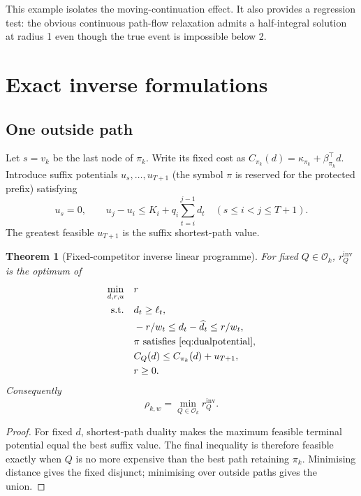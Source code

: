 \documentclass[11pt]{article}
\newtheorem{theorem}{Theorem}[section]
\theoremstyle{definition}
\newcommand{\cO}{\mathcal{O}}
\newcommand{\dhat}{\widehat d}
\newcommand{\ellv}{\ell}
\begin{document}
This example isolates the moving-continuation effect. It also provides a regression test: the obvious continuous path-flow relaxation admits a half-integral solution at radius 1 even though the true event is impossible below 2.

\section{Exact inverse formulations}\label{sec:exact}

\subsection{One outside path}

Let $s=v_k$ be the last node of $\pi_k$. Write its fixed cost as $C_{\pi_k}(d)=\kappa_{\pi_k}+\beta_{\pi_k}^\top d$. Introduce suffix potentials $u_s,\ldots,u_{T+1}$ (the symbol $\pi$ is reserved for the protected prefix) satisfying
\begin{equation}\label{eq:dualpotential}
u_s=0,
\qquad
u_j-u_i\le K_i+q_i\sum_{t=i}^{j-1}d_t
\quad(s\le i<j\le T+1).
\end{equation}
The greatest feasible $u_{T+1}$ is the suffix shortest-path value.

\begin{theorem}[Fixed-competitor inverse linear programme]\label{thm:fixedlp}
For fixed $Q\in\cO_k$, $r_Q^{\mathrm{inv}}$ is the optimum of
\begin{align}
\min_{d,r,u}\quad &r\label{eq:fixedlp}\\
\text{s.t.}\quad
&d_t\ge\ellv_t,\notag\\
&-r/w_t\le d_t-\dhat_t\le r/w_t,\notag\\
&\pi\text{ satisfies \eqref{eq:dualpotential}},\notag\\
&C_Q(d)\le C_{\pi_k}(d)+u_{T+1},\notag\\
&r\ge0.\notag
\end{align}
Consequently
\begin{equation}\label{eq:exactdisjunction}
\rho_{k,w}=\min_{Q\in\cO_k}r_Q^{\mathrm{inv}}.
\end{equation}
\end{theorem}

\begin{proof}
For fixed $d$, shortest-path duality makes the maximum feasible terminal potential equal the best suffix value. The final inequality is therefore feasible exactly when $Q$ is no more expensive than the best path retaining $\pi_k$. Minimising distance gives the fixed disjunct; minimising over outside paths gives the union.
\end{proof}
\end{document}
